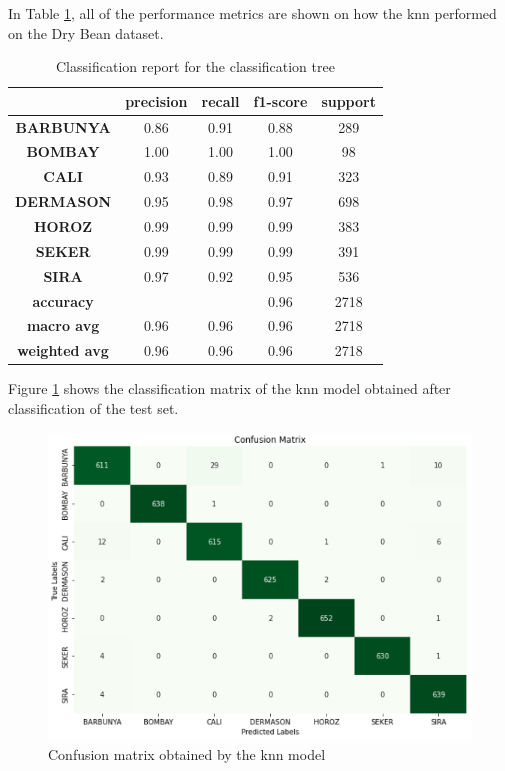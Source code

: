 \documentclass[10pt, conference]{IEEEtran}
\begin{document}
In Table \ref{tab:ct_cfr}, all of the performance metrics are shown on how the \acrshort{knn}
performed on the Dry Bean dataset.
\begin{table}[h!]
    \caption{Classification report for the classification tree}
    \begin{center}
        \begin{tabular}{|c||c|c|c|c|}
            \hline
                        & \textbf{precision} & \textbf{recall} & \textbf{f1-score} & \textbf{support} \\
            \hline
            \textbf{BARBUNYA}  &  0.86   &   0.91   &   0.88    &   289\\
            \textbf{BOMBAY}  & 1.00 & 1.00 & 1.00 & 98\\
            \textbf{CALI} & 0.93   &   0.89   &   0.91    &   323\\
            \textbf{DERMASON} & 0.95   &   0.98   &   0.97   &    698\\
            \textbf{HOROZ} & 0.99   &   0.99   &   0.99    &   383\\
            \textbf{SEKER} & 0.99   &   0.99   &   0.99    &   391\\
            \textbf{SIRA} & 0.97   &   0.92   &   0.95    &   536\\
            \textbf{accuracy} & & & 0.96   &   2718\\
            \textbf{macro avg} & 0.96   &   0.96   &   0.96   &   2718\\
            \textbf{weighted avg} & 0.96  &    0.96   &   0.96   &   2718\\
            \hline
        \end{tabular}
    \end{center}
    \label{tab:ct_cfr}
\end{table}

Figure \ref{KNN confusion matrix} shows the classification matrix of the \acrshort{knn} model
obtained after classification of the test set.
\begin{figure}[H]
    \centerline{\includegraphics[scale=0.5]{../Plots/KNN_confusion_matix.PNG}}
    \caption{Confusion matrix obtained by the \acrshort{knn} model}
    \label{KNN confusion matrix}
\end{figure}
\end{document}
